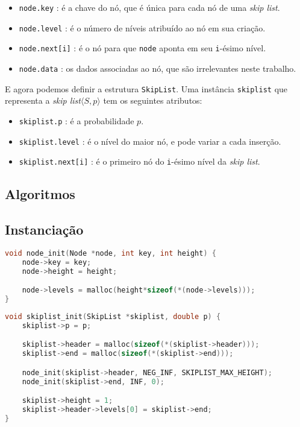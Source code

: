 \documentclass[paper=a4, fontsize=11pt]{scrartcl} %
\numberwithin{equation}{section}
\numberwithin{figure}{section}
\numberwithin{table}{section}
\numberwithin{definition}{section}
\numberwithin{theorem}{section}
\numberwithin{property}{section}
\numberwithin{proposition}{section}
\newcommand{\skl}{\textit{skip list}\xspace}
\begin{document}
\begin{itemize}[noitemsep]
  \item \verb|node.key| : é a chave do nó, que é única para cada nó de uma \skl.
  \item \verb|node.level| : é o número de níveis atribuído ao nó em sua criação.
  \item \verb|node.next[i]| : é o nó para que \verb|node| aponta em seu \verb|i|-ésimo nível.
  \item \verb|node.data| : os dados associadas ao nó, que são irrelevantes neste trabalho.
\end{itemize}

E agora podemos definir a estrutura \verb|SkipList|. Uma instância \verb|skiplist| que representa a 
\skl $\langle S, p \rangle$ tem os seguintes atributos:

\begin{itemize}[noitemsep]
  \item \verb|skiplist.p| : é a probabilidade $p$.
  \item \verb|skiplist.level| : é o nível do maior nó, e pode variar a cada inserção.
  \item \verb|skiplist.next[i]| : é o primeiro nó do \verb|i|-ésimo nível da \skl.
\end{itemize}


\subsection{Algoritmos}

\subsection{Instanciação}
\begin{lstlisting}[caption=Inicialização de nós., language=C]
void node_init(Node *node, int key, int height) {
    node->key = key;
    node->height = height;

    node->levels = malloc(height*sizeof(*(node->levels)));
}
\end{lstlisting}

\begin{lstlisting}[caption=Inicialização de uma skip list., language=C]
void skiplist_init(SkipList *skiplist, double p) {
    skiplist->p = p;

    skiplist->header = malloc(sizeof(*(skiplist->header)));
    skiplist->end = malloc(sizeof(*(skiplist->end)));

    node_init(skiplist->header, NEG_INF, SKIPLIST_MAX_HEIGHT);
    node_init(skiplist->end, INF, 0);

    skiplist->height = 1;
    skiplist->header->levels[0] = skiplist->end;
}
\end{lstlisting}
\end{document}
